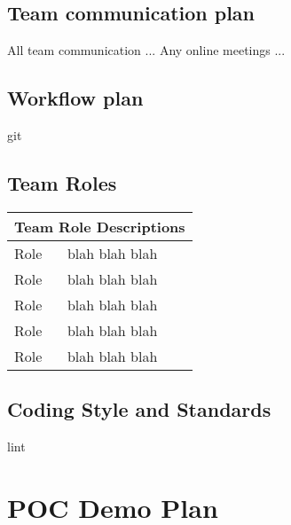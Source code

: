 \documentclass[12pt]{article}
\begin{document}
\subsection{Team communication plan}
All team communication ...
Any online meetings ...

\subsection{Workflow plan}
git

\subsection{Team Roles}
	\begin{tabular}{ |p{6cm}|p{10cm}| }
	\hline
	\multicolumn{2}{|c|}{Team Role Descriptions} \\
	\hline
	Role & blah blah blah \\
	\hline
	Role & blah blah blah \\
	\hline
	Role & blah blah blah \\
	\hline
	Role & blah blah blah \\
	\hline
	Role & blah blah blah \\
	\hline
\end{tabular}

\subsection{Coding Style and Standards}
lint
\section {POC Demo Plan}
\end{document}
